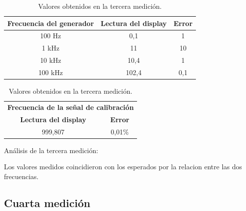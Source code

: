 \documentclass{article}
\begin{document}
\begin{table}[!hbt]
	\begin{center}
		\begin{tabular}{|c|c|c|} \hline
			\textbf{Frecuencia del generador} & \textbf{Lectura del display} & \textbf{Error} \\\hline
			100 Hz & 0,1 & 1 \\\hline
			1 kHz & 11 & 10 \\\hline
			10 kHz & 10,4 & 1 \\\hline
			100 kHz & 102,4 & 0,1 \\\hline
		\end{tabular}

	\caption{Valores obtenidos en la tercera medición.}
	\end{center}
\end{table}
\medskip


\begin{table}[!hbt]
	\begin{center}
		\begin{tabular}{|c|c|} \hline
			\multicolumn{2}{|c|}{\textbf{Frecuencia de la señal de calibración}} \\\cline{1-2}
			\textbf{Lectura del display} & \textbf{Error} \\\hline
			999,807 & 0,01\% \\\hline
		\end{tabular}

	\caption{Valores obtenidos en la tercera medición.}
	\end{center}
\end{table}
\medskip

Análisis de la tercera medición:

		Los valores medidos coincidieron con los esperados por la relacion entre las dos frecuencias.


\subsection{Cuarta medición}
\end{document}
